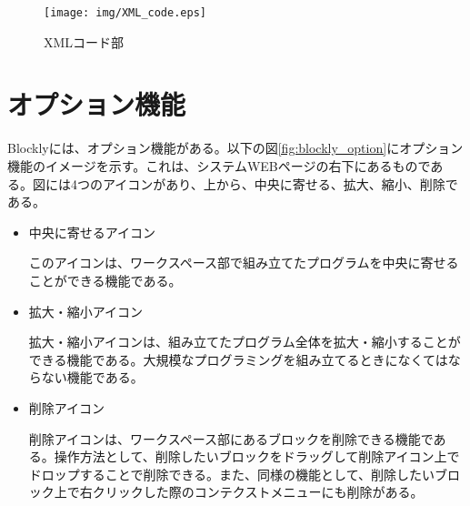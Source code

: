 \documentclass{risepaper}
\begin{document}



\begin{figure}[h]
\begin{center}
\texttt{[image: img/XML\_code.eps]}
\caption{XMLコード部}%
\label{fig:XML_code}
\end{center}%
\end{figure}%
   
   \section{オプション機能}
   
Blocklyには、オプション機能がある。以下の図\ref{fig:blockly_option}にオプション機能のイメージを示す。これは、システムWEBページの右下にあるものである。図には4つのアイコンがあり、上から、中央に寄せる、拡大、縮小、削除である。

\begin{itemize}

\item 中央に寄せるアイコン

このアイコンは、ワークスペース部で組み立てたプログラムを中央に寄せることができる機能である。

\item 拡大・縮小アイコン

拡大・縮小アイコンは、組み立てたプログラム全体を拡大・縮小することができる機能である。大規模なプログラミングを組み立てるときになくてはならない機能である。

\item 削除アイコン

削除アイコンは、ワークスペース部にあるブロックを削除できる機能である。操作方法として、削除したいブロックをドラッグして削除アイコン上でドロップすることで削除できる。また、同様の機能として、削除したいブロック上で右クリックした際のコンテクストメニューにも削除がある。

\end{itemize} 
\end{document}
